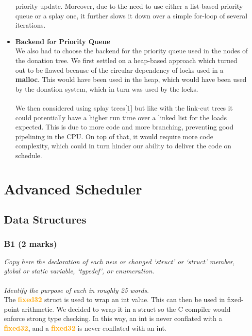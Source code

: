 \documentclass{report}
\newcommand{\question}[1]{\textit{#1} \\ }
\newcommand{\bullpara}[2]{\item \textbf{#1} \ #2}
\newcommand{\fun}[1]{\textcolor{Emerald}{\textbf{#1}}}
\newcommand{\file}[1]{\textcolor{YellowGreen}{\textbf{#1}}}
\newcommand{\struct}[1]{\textcolor{orange}{\textbf{#1}}}
\newcommand{\pintoscode}[4]{}
\begin{document}
\begin{itemize}
{                            priority update. Moreover, due to the need to use either a list-based priority queue or a splay one, it further slows it down over
                            a simple for-loop of several iterations.
                        }
                        \bullpara{Backend for Priority Queue}{
                            \\ We also had to choose the backend for the priority queue used in the nodes of the donation tree. We first settled on a heap-based approach
                            which turned out to be flawed because of the circular dependency of locks used in a \fun{malloc}. This would have been used in the heap,
                            which would have been used by the donation system, which in turn was used by the locks. 
                            \\ \\ We then considered using splay trees[1] but
                            like with the link-cut trees it could potentially have a higher run time over a linked list for the loads expected. This is due to more code and more branching,
                            preventing good pipelining in the CPU. On top of that, it would require more code complexity, which could in turn hinder our ability to deliver the code
                            on schedule.
                        }
                    \end{itemize}

    \section*{Advanced Scheduler}

        \subsection*{Data Structures}
            \subsubsection*{B1  (2 marks)}
                \question{Copy here the declaration of each new or changed `struct' or `struct' member, global or static variable, `typedef', or enumeration. 
                \\
                \\ Identify the purpose of each in roughly 25 words.}
                \pintoscode{17}{19}{fixed-point.h}{../lib/kernel/fixed-point.h}
                The \struct{fixed32} struct is used to wrap an int value. This can then be used in fixed-point arithmetic. 
                We decided to wrap it in a struct so the C compiler would enforce strong type checking. In this way, an int 
                is never conflated with a \struct{fixed32}, and a \struct{fixed32} is never conflated with an int.
                
\end{document}
